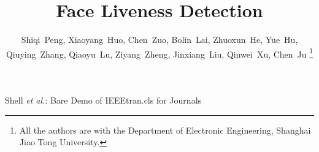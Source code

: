 \documentclass[journal]{IEEEtran}
\begin{document}
%
\title{Face Liveness Detection}
%
%
%

\author{Shiqi~Peng, Xiaoyang~Huo, Chen~Zuo, Bolin~Lai, Zhuoxun~He, Yue~Hu, Qiuying~Zhang, Qiaoyu~Lu, Ziyang~Zheng, Jinxiang~Liu, Qinwei~Xu, Chen~Ju%
\thanks{All the authors are with the Department
of Electronic Engineering, Shanghai Jiao Tong University.}}

%
%



%
{Shell \MakeLowercase{\textit{et al.}}: Bare Demo of IEEEtran.cls for Journals}
%
\end{document}
